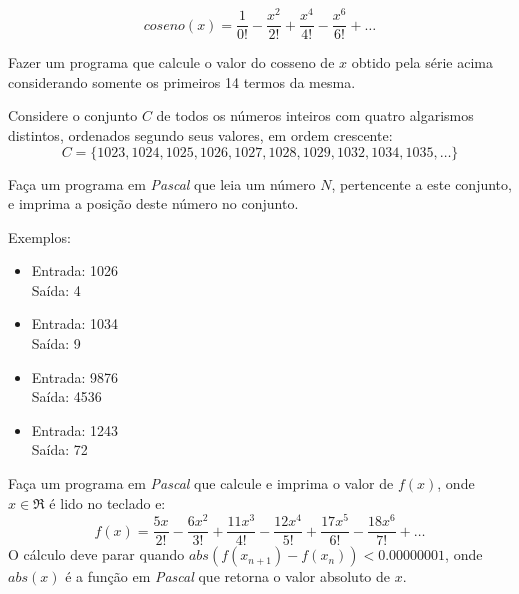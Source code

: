 \begin{center}
\[
coseno(x) = \frac{1}{0!} - \frac{x^2}{2!} + \frac{x^4}{4!} - \frac{x^6}{6!} 
           + \ldots
\]
\end{center}

    Fazer um  programa que calcule o  valor do cosseno de $x$ 
    obtido  pela série acima considerando somente os primeiros 14  
    termos da mesma.

\item Considere o conjunto $C$ de todos os números inteiros com quatro algarismos
distintos, ordenados segundo seus valores, em ordem crescente:
\begin{displaymath}
C = \{1023, 1024, 1025, 1026, 1027, 1028, 1029, 1032, 1034, 1035, \dots\}
\end{displaymath}

\vspace{-.2cm}
Faça um programa em \emph{Pascal} que leia um número $N$, pertencente a este
conjunto, e imprima a posição deste número no conjunto.

Exemplos:

\vspace{.1cm}
\begin{minipage}{2in}
\begin{itemize}
\item
Entrada: 1026\\
Saída: 4
\vspace{-.2cm}
\item
Entrada: 1034\\
Saída: 9
\end{itemize}
\end{minipage}
\begin{minipage}{2in}
\begin{itemize}
\item
Entrada: 9876\\
Saída: 4536
\vspace{-.2cm}
\item
Entrada: 1243\\
Saída: 72
\end{itemize}
\end{minipage}

\item Faça um programa em \emph{Pascal} que calcule e imprima o valor de $f(x)$, onde $x\in\Re$ é lido no teclado e:
\begin{equation*}
 f(x) = \frac{5x}{2!} - \frac{6x^2}{3!} + \frac{11x^3}{4!} - \frac{12x^4}{5!} + \frac{17x^5}{6!} - \frac{18x^6}{7!} + \ldots
\end{equation*}
O cálculo deve parar quando $abs(f(x_{n+1})-f(x_n)) < 0.00000001$, onde $abs(x)$ é a função em \emph{Pascal} que retorna o valor absoluto de $x$.

